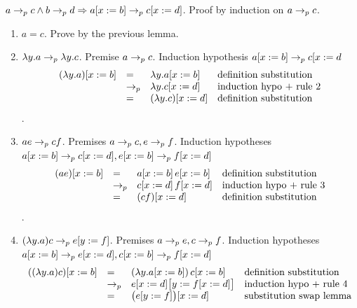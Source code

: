 \documentclass{article}
\begin{document}
\begin{lemma}
  $a \to_{p} c \land b \to_{p} d  \Rightarrow a[x := b] \to_{p} c[x := d]$. Proof
  by induction on $a \to_{p} c $.
  \begin{enumerate}
  \item
    $a=c$. Prove by the previous lemma.
  \item
    $\lambda y.a \to_{p} \lambda y.c$. Premise $a \to_{p} c$. Induction
    hypothesis $a[x := b] \to_{p} c[x := d$
    $$
    \begin{array}{llll}
      (\lambda y.a)[x := b]  &=& \lambda y.a [x := b] &\text{definition substitution}\\
                             &\to_{p}& \lambda y.c[x := d] &\text{induction hypo + rule 2} \\
                             &=& (\lambda y.c)[x := d] &\text{definition substitution}
    \end{array}
    $$.
  \item
    $a e \to_{p} c f$.
    Premises $a\to_{p} c, e\to_{p} f$.
    Induction hypotheses
      $a[x := b] \to_{p} c[x := d],
       e[x := b] \to_{p} f[x := d]$
    $$
    \begin{array}{llll}
      (a e)[x := b]  &=& a[x := b]\, e[x := b] &\text{definition substitution}\\
                     &\to_{p}& c[x := d] \, f[x := d] &\text{induction hypo + rule 3} \\
                     &=& (c f)[x := d] &\text{definition substitution}
    \end{array}
    $$.
  \item
    $(\lambda y.a) c \to_{p} e[y:=f]$.
    Premises $a \to_{p} e, c \to_{p} f$.
    Induction hypotheses
      $a[x:=b] \to_{p} e[x := d],
        c[x:=b]  \to_{p} f[x := d]$
    $$
    \begin{array}{llll}
      ((\lambda y.a) c)[x := b]  &=& (\lambda y.a[x := b])\, c[x := b] &
                                                                         \text{definition substitution}\\
                     &\to_{p}& e[x := d]\big[y:=f[x := d]\big] &
                                                                  \text{induction hypo + rule 4} \\
                     &=& \big(e[y:=f]\big)[x := d] &
                                                                  \text{substitution
                                                           swap lemma}
    \end{array}
    $$
  \end{enumerate}
\end{lemma}
\end{document}
